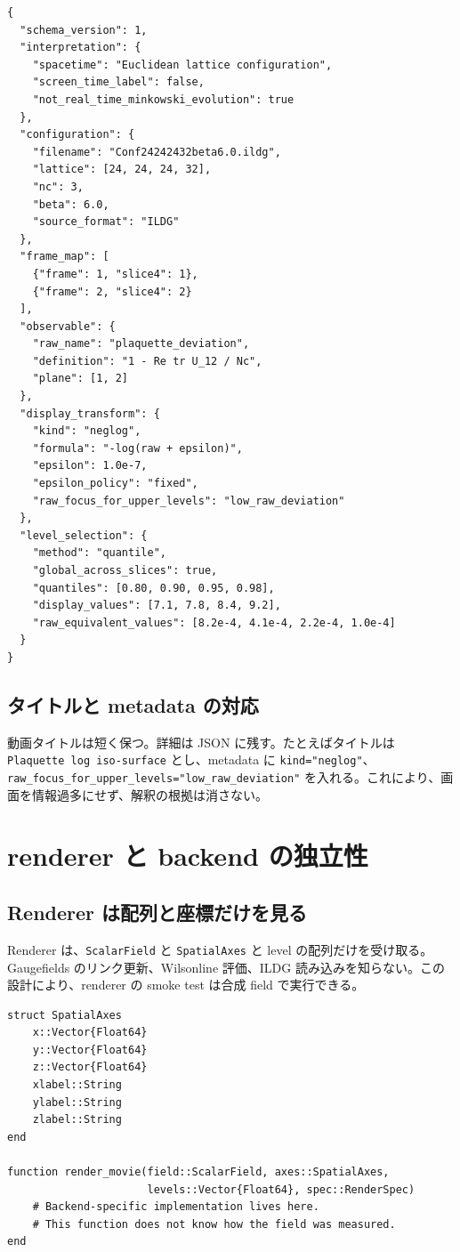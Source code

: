 \documentclass[uplatex,dvipdfmx,ja=standard,11pt,a4paper]{bxjsarticle}
\newcommand{\code}[1]{\texttt{#1}}
\begin{document}
\begin{lstlisting}[style=json,caption={metadata sidecar の例}]
{
  "schema_version": 1,
  "interpretation": {
    "spacetime": "Euclidean lattice configuration",
    "screen_time_label": false,
    "not_real_time_minkowski_evolution": true
  },
  "configuration": {
    "filename": "Conf24242432beta6.0.ildg",
    "lattice": [24, 24, 24, 32],
    "nc": 3,
    "beta": 6.0,
    "source_format": "ILDG"
  },
  "frame_map": [
    {"frame": 1, "slice4": 1},
    {"frame": 2, "slice4": 2}
  ],
  "observable": {
    "raw_name": "plaquette_deviation",
    "definition": "1 - Re tr U_12 / Nc",
    "plane": [1, 2]
  },
  "display_transform": {
    "kind": "neglog",
    "formula": "-log(raw + epsilon)",
    "epsilon": 1.0e-7,
    "epsilon_policy": "fixed",
    "raw_focus_for_upper_levels": "low_raw_deviation"
  },
  "level_selection": {
    "method": "quantile",
    "global_across_slices": true,
    "quantiles": [0.80, 0.90, 0.95, 0.98],
    "display_values": [7.1, 7.8, 8.4, 9.2],
    "raw_equivalent_values": [8.2e-4, 4.1e-4, 2.2e-4, 1.0e-4]
  }
}
\end{lstlisting}

\subsection{タイトルと metadata の対応}
動画タイトルは短く保つ。詳細は JSON に残す。たとえばタイトルは \code{Plaquette log iso-surface} とし、metadata に \code{kind="neglog"}、\code{raw\_focus\_for\_upper\_levels="low\_raw\_deviation"} を入れる。これにより、画面を情報過多にせず、解釈の根拠は消さない。

\section{renderer と backend の独立性}
\subsection{Renderer は配列と座標だけを見る}
Renderer は、\code{ScalarField} と \code{SpatialAxes} と level の配列だけを受け取る。Gaugefields のリンク更新、Wilsonline 評価、ILDG 読み込みを知らない。この設計により、renderer の smoke test は合成 field で実行できる。

\begin{lstlisting}[style=julia,caption={Renderer 入力の型案}]
struct SpatialAxes
    x::Vector{Float64}
    y::Vector{Float64}
    z::Vector{Float64}
    xlabel::String
    ylabel::String
    zlabel::String
end

function render_movie(field::ScalarField, axes::SpatialAxes,
                      levels::Vector{Float64}, spec::RenderSpec)
    # Backend-specific implementation lives here.
    # This function does not know how the field was measured.
end
\end{lstlisting}
\end{document}
